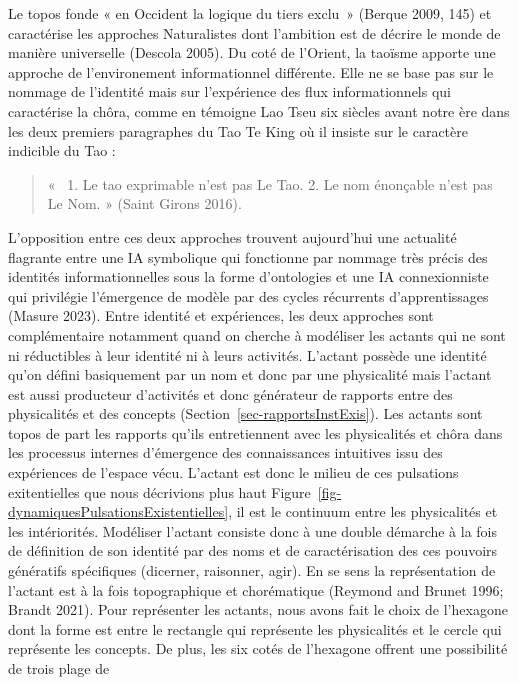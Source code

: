 \documentclass[
  letterpaper,
  DIV=11,
  numbers=noendperiod]{scrreprt}
\begin{document}
Le topos fonde « en Occident la logique du tiers exclu~» (Berque 2009,
145) et caractérise les approches Naturalistes dont l'ambition est de
décrire le monde de manière universelle (Descola 2005). Du coté de
l'Orient, la taoïsme apporte une approche de l'environement
informationnel différente. Elle ne se base pas sur le nommage de
l'identité mais sur l'expérience des flux informationnels qui
caractérise la chôra, comme en témoigne Lao Tseu six siècles avant notre
ère dans les deux premiers paragraphes du Tao Te King où il insiste sur
le caractère indicible du Tao :

\begin{quote}
«~ 1. Le tao exprimable n'est pas Le Tao. 2. Le nom énonçable n'est pas
Le Nom. » (Saint Girons 2016).
\end{quote}

L'opposition entre ces deux approches trouvent aujourd'hui une actualité
flagrante entre une IA symbolique qui fonctionne par nommage très précis
des identités informationnelles sous la forme d'ontologies et une IA
connexionniste qui privilégie l'émergence de modèle par des cycles
récurrents d'apprentissages (Masure 2023). Entre identité et
expériences, les deux approches sont complémentaire notamment quand on
cherche à modéliser les actants qui ne sont ni réductibles à leur
identité ni à leurs activités. L'actant possède une identité qu'on
défini basiquement par un nom et donc par une physicalité mais l'actant
est aussi producteur d'activités et donc générateur de rapports entre
des physicalités et des concepts (Section~\ref{sec-rapportsInstExis}).
Les actants sont topos de part les rapports qu'ils entretiennent avec
les physicalités et chôra dans les processus internes d'émergence des
connaissances intuitives issu des expériences de l'espace vécu. L'actant
est donc le milieu de ces pulsations exitentielles que nous décrivions
plus haut Figure~\ref{fig-dynamiquesPulsationsExistentielles}, il est le
continuum entre les physicalités et les intériorités. Modéliser l'actant
consiste donc à une double démarche à la fois de définition de son
identité par des noms et de caractérisation des ces pouvoirs génératifs
spécifiques (dicerner, raisonner, agir). En se sens la représentation de
l'actant est à la fois topographique et chorématique (Reymond and Brunet
1996; Brandt 2021). Pour représenter les actants, nous avons fait le
choix de l'hexagone dont la forme est entre le rectangle qui représente
les physicalités et le cercle qui représente les concepts. De plus, les
six cotés de l'hexagone offrent une possibilité de trois plage de
\end{document}
